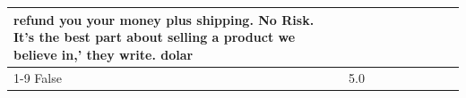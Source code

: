 \begin{table}[H]
{\begin{tabular}{lllrlllll}
refund you your money plus shipping. No Risk. It’s the best part about selling a product we believe in,' they write. dolar \\
\cline{1-9}
False & 5.0%

\end{tabular}}
\end{table}
